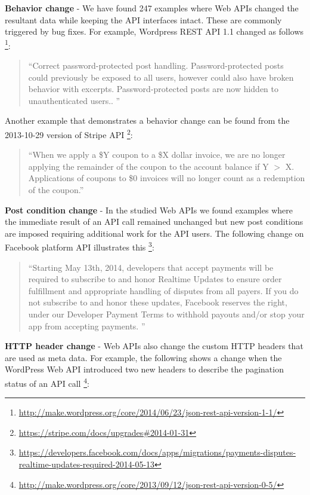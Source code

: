 \documentclass[conference]{IEEEtran}
\begin{document}
\textbf{Behavior change} - We have found 247 examples where Web APIs changed the resultant data while keeping the API interfaces intact. These are commonly triggered by bug fixes. For example, Wordpress REST API 1.1 changed as follows \footnote{\url{http://make.wordpress.org/core/2014/06/23/json-rest-api-version-1-1/}}:

\small
\begin{quotation}
``Correct password-protected post handling.
Password-protected posts could previously be exposed to all users, however
could also have broken behavior with excerpts. Password-protected posts are
now hidden to unauthenticated users..
''\end{quotation}
\normalsize

Another example that demonstrates a behavior change can be found from the 2013-10-29 version of Stripe API \footnote{\url{https://stripe.com/docs/upgrades#2014-01-31}}:

\small
\begin{quotation}
``When we apply a \$Y coupon to a \$X dollar invoice, we are no longer applying the remainder of the coupon to the account balance if Y $>$ X. Applications of coupons to \$0 invoices will no longer count as a redemption of the coupon.''
\end{quotation}
\normalsize

\textbf{Post condition change} - In the studied Web APIs we found examples where the immediate result of an API call remained unchanged but new post conditions are imposed requiring additional work for the API users. The following change on Facebook platform API illustrates this \footnote{\url{https://developers.facebook.com/docs/apps/migrations/payments-disputes-realtime-updates-required-2014-05-13}}:

\small
\begin{quotation}
``Starting May 13th, 2014, developers that accept payments will be required to subscribe to and honor Realtime Updates to ensure order fulfillment and appropriate handling of disputes from all payers. If you do not subscribe to and honor these updates, Facebook reserves the right, under our Developer Payment Terms to withhold payouts and/or stop your app from accepting payments.
''\end{quotation}
\normalsize

\textbf{HTTP header change} - Web APIs also change the custom HTTP headers that are used as meta data. For example, the following shows a change when the WordPress Web API introduced two new headers to describe the pagination status of an API call \footnote{\url{http://make.wordpress.org/core/2013/09/12/json-rest-api-version-0-5/}}:
\end{document}
